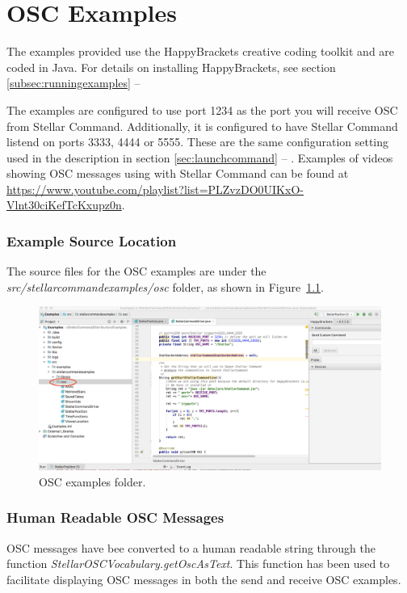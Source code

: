 \chapter{OSC Examples}\label{chap:oscexamples}
The examples provided use the HappyBrackets creative coding toolkit and are coded in Java. For details on installing HappyBrackets, see section \ref{subsec:runningexamples} --
\emph{}

The examples are configured to use port 1234 as the port you will receive OSC from Stellar Command. Additionally, it is configured to have Stellar Command listend on ports 3333, 4444 or 5555. These are the same configuration setting used in the description in section \ref{sec:launchcommand} --
\emph{}. Examples of videos showing OSC messages using with Stellar Command can be found at \url{https://www.youtube.com/playlist?list=PLZvzDO0UIKxO-Vlnt30ciKefTcKxupz0n}.

\subsection{Example Source Location}

The source files for the OSC examples are under the \textit{src/stellarcommandexamples/osc} folder, as shown in 
Figure~\ref{fig:oscexamplefolder}.

\begin{figure}[htbp]
	\centering
	\includegraphics[width=1\columnwidth]{oscexamplefolder}
	\caption{OSC examples folder.}
	\label{fig:oscexamplefolder}
\end{figure}

\subsection{Human Readable OSC Messages}
OSC messages have bee converted to a human readable string through the function \textit{StellarOSCVocabulary.getOscAsText}. This function has been used to facilitate displaying OSC messages in both the send and receive OSC examples.

